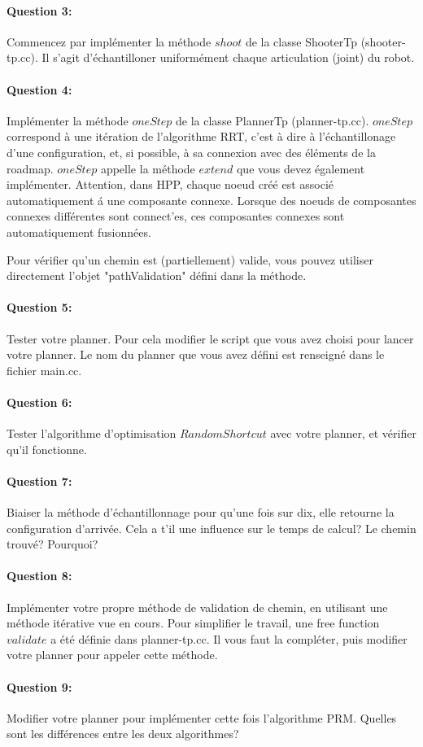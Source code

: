 \documentclass {article}
\begin{document}
\paragraph {Question 3:}
Commencez par impl\'ementer la m\'ethode $shoot$ de la classe ShooterTp (shooter-tp.cc).
Il s'agit d'\'echantilloner uniform\'ement chaque articulation (joint) du robot.

\paragraph {Question 4:}
Impl\'ementer la m\'ethode $oneStep$ de la classe PlannerTp (planner-tp.cc).
$oneStep$ correspond \`a une it\'eration de l'algorithme RRT, c'est \`a dire \`a l'\'echantillonage d'une configuration,
et, si possible, \`a sa connexion avec des \'el\'ements de la roadmap.
$oneStep$ appelle la m\'ethode $extend$ que vous devez \'egalement impl\'ementer.
Attention, dans HPP, chaque noeud cr\'e\'e est associ\'e automatiquement \'a une composante connexe.
Lorsque des noeuds de composantes connexes diff\'erentes sont connect'es, ces composantes connexes sont automatiquement
fusionn\'ees.

Pour v\'erifier qu'un chemin est (partiellement) valide, vous pouvez utiliser directement l'objet
"pathValidation" défini dans la méthode.

\paragraph {Question 5:}
Tester votre planner. Pour cela modifier le script que vous avez choisi pour lancer votre planner.
Le nom du planner que vous avez d\'efini est renseign\'e dans le fichier main.cc.

\paragraph {Question 6:}
Tester l'algorithme d'optimisation $RandomShortcut$ avec votre planner, et v\'erifier qu'il fonctionne.

\paragraph {Question 7:}
Biaiser la m\'ethode d'\'echantillonnage pour qu'une fois sur dix, elle retourne la configuration d'arriv\'ee.
Cela a t'il une influence sur le temps de calcul? Le chemin trouv\'e?
Pourquoi?

\paragraph{Question 8:}
Impl\'ementer votre propre m\'ethode de validation de chemin, en utilisant une m\'ethode it\'erative
vue en cours. Pour simplifier le travail, une free function $validate$ a été d\'efinie dans planner-tp.cc.
Il vous faut la compl\'eter, puis modifier votre planner pour appeler cette m\'ethode.

\paragraph{Question 9:}
Modifier votre planner pour impl\'ementer cette fois l'algorithme PRM.
Quelles sont les diff\'erences entre les deux algorithmes?
\end{document}
